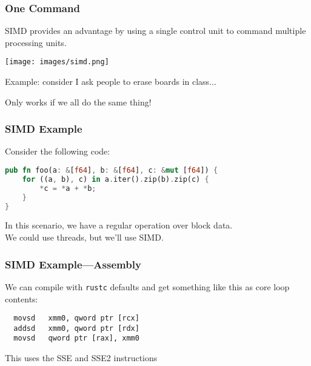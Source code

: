 \begin{frame}
\frametitle{One Command}

SIMD provides an advantage by using a single control unit to command multiple processing units.


\begin{center}
	\texttt{[image: images/simd.png]}
\end{center}

Example: consider I ask people to erase boards in class...

Only works if we all do the same thing!

\end{frame}


\begin{frame}[fragile]
  \frametitle{SIMD Example}

  
  Consider the following code:

\begin{lstlisting}[language=Rust]
pub fn foo(a: &[f64], b: &[f64], c: &mut [f64]) {
    for ((a, b), c) in a.iter().zip(b).zip(c) {
        *c = *a + *b;
    }
}\end{lstlisting}

    In this scenario, we have a regular operation over block data.\\[1em]

    We could use threads, but we'll use SIMD.

  
\end{frame}

\begin{frame}[fragile]
  \frametitle{SIMD Example---Assembly}

We can compile with \texttt{rustc} defaults
and get something like this as core loop contents:
\begin{verbatim}
  movsd   xmm0, qword ptr [rcx]
  addsd   xmm0, qword ptr [rdx]
  movsd   qword ptr [rax], xmm0
\end{verbatim}

This uses the SSE and SSE2 instructions
  
\end{frame}


